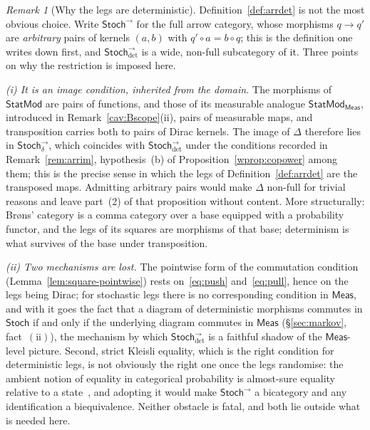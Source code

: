 \documentclass[11pt,a4paper]{article}
\theoremstyle{plain}
\theoremstyle{definition}
\theoremstyle{remark}
\newtheorem{remark}[theorem]{Remark}
\newcommand{\cat}[1]{\mathsf{#1}}
\newcommand{\Meas}{\cat{Meas}}
\newcommand{\Stoch}{\cat{Stoch}}
\newcommand{\del}{\delta}
\newcommand{\StatMod}{\cat{StatMod}}
\newcommand{\Statk}{\StatMod_{\Meas}}
\newcommand{\Jc}{\Delta}            %
\newcommand{\Arrdet}[1]{#1^{\rightarrow}_{\det}}
\newcommand{\Arrim}[1]{#1^{\rightarrow}_{\del}}
\begin{document}
\begin{remark}[Why the legs are deterministic]\label{rem:whydet}
Definition~\ref{def:arrdet} is not the most obvious choice. Write
$\Stoch^{\rightarrow}$ for the full arrow category, whose morphisms
$q \to q'$ are \emph{arbitrary} pairs of kernels $(a,b)$ with
$q' \circ a = b \circ q$; this is the definition one writes down first, and
$\Arrdet{\Stoch}$ is a wide, non-full subcategory of it. Three points on why
the restriction is imposed here.

\emph{(i) It is an image condition, inherited from the domain.} The morphisms
of $\StatMod$ are pairs of functions, and those of its measurable analogue
$\Statk$, introduced in Remark~\ref{cav:Bscope}(ii), pairs of measurable
maps, and transposition carries both to pairs of Dirac kernels. The image
of $\Jc$ therefore lies in $\Arrim{\Stoch}$, which coincides with
$\Arrdet{\Stoch}$ under the conditions recorded in
Remark~\ref{rem:arrim}, hypothesis~(b) of Proposition~\ref{wprop:copower}
among them; this is the precise sense in which the legs of
Definition~\ref{def:arrdet} are the transposed maps. Admitting arbitrary
pairs would make $\Jc$
non-full for trivial reasons and leave part~(2) of that proposition without
content. More structurally: Br\o ns' category is a comma category over a base
equipped with a probability functor, and the legs of its squares are morphisms
of that base; determinism is what survives of the base under transposition.

\emph{(ii) Two mechanisms are lost.} The pointwise form of the commutation
condition (Lemma~\ref{lem:square-pointwise}) rests on~\eqref{eq:push}
and~\eqref{eq:pull}, hence on the legs being Dirac; for stochastic legs there is no corresponding
condition in $\Meas$, and with it goes the fact that a diagram of
deterministic morphisms commutes in $\Stoch$ if and only if the underlying
diagram commutes in $\Meas$ (\S\ref{sec:markov}, fact~$(\mathrm{ii})$), the
mechanism by which $\Arrdet{\Stoch}$ is a faithful shadow of the
$\Meas$-level picture. Second, strict Kleisli equality, which is the right
condition for deterministic legs, is not obviously the right one once the legs
randomise: the ambient notion of equality in categorical probability is
almost-sure equality relative to a state~\cite[\S13]{fritz_synthetic_2020}, and
adopting it would make $\Stoch^{\rightarrow}$ a bicategory and any
identification a biequivalence. Neither obstacle is fatal, and both lie outside what is needed here.


\end{remark}
\end{document}
